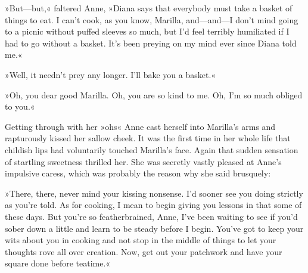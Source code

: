 »But—but,« faltered Anne, »Diana says that everybody must take a basket of things to eat. I can't cook, as you know, Marilla, and—and—I don't mind going to a picnic without puffed sleeves so much, but I'd feel terribly humiliated if I had to go without a basket. It's been preying on my mind ever since Diana told me.«

»Well, it needn't prey any longer. I'll bake you a basket.«

»Oh, you dear good Marilla. Oh, you are so kind to me. Oh, I'm so much obliged to you.«

Getting through with her »ohs« Anne cast herself into Marilla's arms and rapturously kissed her sallow cheek. It was the first time in her whole life that childish lips had voluntarily touched Marilla's face. Again that sudden sensation of startling sweetness thrilled her. She was secretly vastly pleased at Anne's impulsive caress, which was probably the reason why she said brusquely:

»There, there, never mind your kissing nonsense. I'd sooner see you doing strictly as you're told. As for cooking, I mean to begin giving you lessons in that some of these days. But you're so featherbrained, Anne, I've been waiting to see if you'd sober down a little and learn to be steady before I begin. You've got to keep your wits about you in cooking and not stop in the middle of things to let your thoughts rove all over creation. Now, get out your patchwork and have your square done before teatime.«

